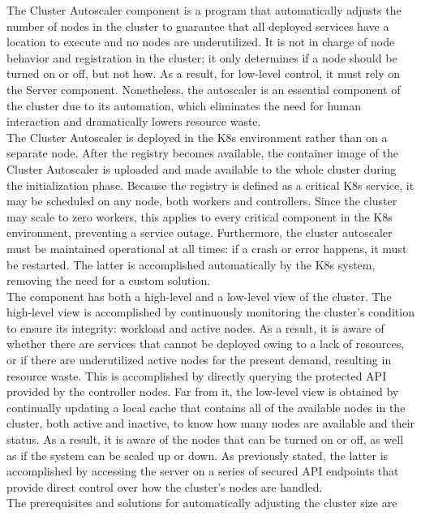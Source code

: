 The Cluster Autoscaler component is a program that automatically adjusts the number
of nodes in the cluster to guarantee that all deployed services have a location to
execute and no nodes are underutilized\cite{cluster_autoscaler}. It is not in charge
of node behavior and registration in the cluster; it only determines if a node
should be turned on or off, but not how. As a result, for low-level control, it
must rely on the Server component. Nonetheless, the autoscaler is an essential
component of the cluster due to its automation, which eliminates the need for human
interaction and dramatically lowers resource waste. \\ %
The Cluster Autoscaler is deployed in the K8s environment rather than on a separate
node. After the registry becomes available, the container image of the Cluster Autoscaler
is uploaded and made available to the whole cluster during the initialization phase.
Because the registry is defined as a critical K8s service, it may be scheduled on
any node, both workers and controllers. Since the cluster may scale to zero workers,
this applies to every critical component in the K8s environment, preventing a service
outage. Furthermore, the cluster autoscaler must be maintained operational at all
times: if a crash or error happens, it must be restarted. The latter is
accomplished automatically by the K8s system, removing the need for a custom solution.
\\ %
The component has both a high-level and a low-level view of the cluster. The
high-level view is accomplished by continuously monitoring the cluster's
condition to ensure its integrity: workload and active nodes. As a result, it is
aware of whether there are services that cannot be deployed owing to a lack of resources,
or if there are underutilized active nodes for the present demand, resulting in resource
waste. This is accomplished by directly querying the protected API provided by
the controller nodes. Far from it, the low-level view is obtained by continually
updating a local cache that contains all of the available nodes in the cluster, both
active and inactive, to know how many nodes are available and their status. As a
result, it is aware of the nodes that can be turned on or off, as well as if the
system can be scaled up or down. As previously stated, the latter is accomplished
by accessing the server on a series of secured API endpoints that provide direct
control over how the cluster's nodes are handled. \\ %
The prerequisites and solutions for automatically adjusting the cluster size are
